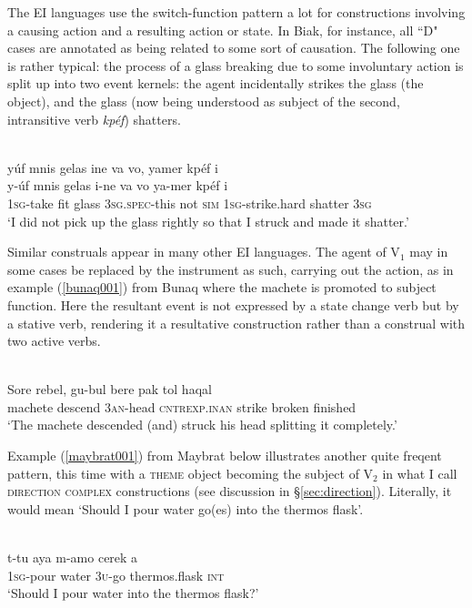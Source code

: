 The EI languages use the switch-function pattern a lot for constructions involving a causing action and a resulting action or state. In Biak, for instance, all ``D" cases are annotated as being related to some sort of causation. The following one is rather typical: the process of a glass breaking due to some involuntary action is split up into two event kernels: the agent incidentally strikes the glass (the object), and the glass (now being understood as subject of the second, intransitive verb \textit{kpéf}) shatters.

\ea 
{}\\
\glll yúf mnis gelas ine va vo, yamer kpéf i \\
y-úf mnis gelas i-ne va vo ya-mer kpéf i \\
1\textsc{sg}-take fit glass 3\textsc{sg}.\textsc{spec}-this not \textsc{sim} 1\textsc{sg}-strike.hard shatter 3\textsc{sg} \\
\glft `I did not pick up the glass rightly so that I struck and made it shatter.'\\ 
\z

Similar construals appear in many other EI languages. The agent of V$_1$ may in some cases be replaced by the instrument as such, carrying out the action, as in example (\ref{bunaq001}) from Bunaq where the machete is promoted to subject function. Here the resultant event is not expressed by a state change verb but by a stative verb, rendering it a resultative construction rather than a construal with two active verbs.

\ea \label{bunaq001}
\\
\gll Sore rebel, gu-bul bere pak tol haqal \\
machete descend 3\textsc{an}-head \textsc{cntrexp}.\textsc{inan} strike broken finished \\
\glft `The machete descended (and) struck his head splitting it completely.’\\ 
\z

Example (\ref{maybrat001}) from Maybrat below illustrates another quite freqent pattern, this time with a \textsc{theme} object becoming the subject of V$_2$ in what I call \textsc{direction complex} constructions (see discussion in §\ref{sec:direction}). Literally, it would mean `Should I pour water go(es) into the thermos flask'.

\ea \label{maybrat001}
\\
\gll t-tu aya m-amo cerek a \\
1\textsc{sg}-pour water 3\textsc{u}-go thermos.flask \textsc{int} \\
\glft `Should I pour water into the thermos flask?'\\ 
\z

